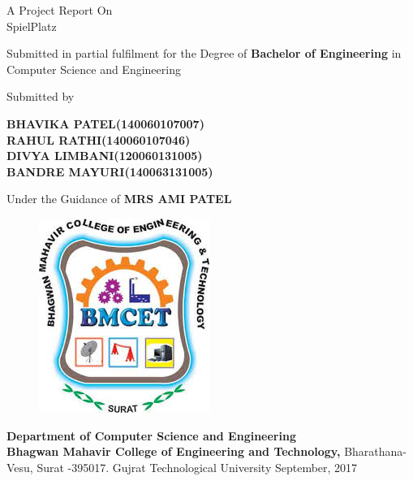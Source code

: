 \documentclass[12pt,a4paper,final,oneside]{report}
\begin{document}
\begin{center}
\thispagestyle{empty}
A Project Report On\\
\LARGE{\huge SpielPlatz}
\end{center}
\vspace{1.0cm}
\begin{center}
Submitted in partial fulfilment for the
\linebreak Degree of \textbf{Bachelor of Engineering} in
\linebreak Computer Science and Engineering
\end{center}
\vspace{1cm}
\begin{center}
Submitted by 

\textbf{BHAVIKA PATEL(140060107007)}\\
\textbf{RAHUL RATHI(140060107046)}\\
\textbf{DIVYA LIMBANI(120060131005)}\\
\textbf{BANDRE MAYURI(140063131005)}\\
\vspace{1cm}

Under the Guidance of 
\linebreak 
\vspace{1mm}
\textbf{MRS AMI PATEL}
\end{center}

\centering
	\begin{figure}[h]
		\centering
		\includegraphics[width=0.45\linewidth,angle=0]
		{bmcet.png}
		
	\end{figure}
\vspace{0.7cm}
\begin{center}
\textbf{Department of Computer Science and Engineering\\
Bhagwan Mahavir College of Engineering and Technology,}
\linebreak Bharathana-Vesu, Surat -395017.
\linebreak Gujrat Technological University
\linebreak September, 2017
\end{center}
\end{document}

